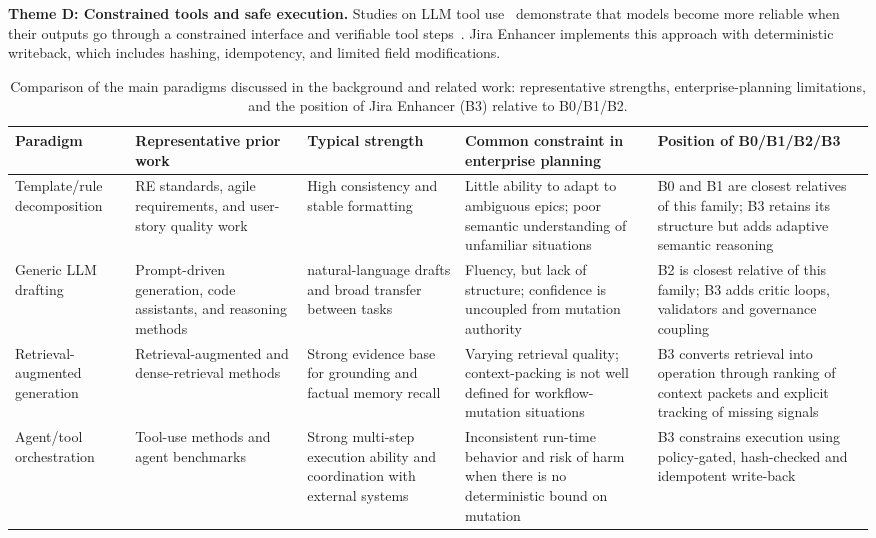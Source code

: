 \documentclass[pdflatex,sn-basic]{sn-jnl}
\begin{document}
\textbf{Theme D: Constrained tools and safe execution.} Studies on LLM tool use~\citep{R16} demonstrate that models become more reliable when their outputs go through a constrained interface and verifiable tool steps~\citep{R91}. Jira Enhancer implements this approach with deterministic writeback, which includes hashing, idempotency, and limited field modifications.

\begin{table}
\centering
\setlength{\tabcolsep}{4pt}
\small
\caption{Comparison of the main paradigms discussed in the background and related work: representative strengths, enterprise-planning limitations, and the position of Jira Enhancer (B3) relative to B0/B1/B2.}
\label{tab:related-work-comparative}
\begin{tabularx}{\textheight}{@{}>{\raggedright\arraybackslash}p{0.16\textheight}>{\raggedright\arraybackslash}p{0.19\textheight}>{\raggedright\arraybackslash}p{0.18\textheight}>{\raggedright\arraybackslash}p{0.20\textheight}>{\raggedright\arraybackslash}X@{}}
\toprule
Paradigm & Representative prior work & Typical strength & Common constraint in enterprise planning & Position of B0/B1/B2/B3 \\
\midrule
Template/rule decomposition & RE standards, agile requirements, and user-story quality work \citep{R52,R62,R63} & High consistency and stable formatting & Little ability to adapt to ambiguous epics; poor semantic understanding of unfamiliar situations & B0 and B1 are closest relatives of this family; B3 retains its structure but adds adaptive semantic reasoning \\
Generic LLM drafting & Prompt-driven generation, code assistants, and reasoning methods \citep{R1,R14,R59,R77} & natural-language drafts and broad transfer between tasks & Fluency, but lack of structure; confidence is uncoupled from mutation authority & B2 is closest relative of this family; B3 adds critic loops, validators and governance coupling \\
Retrieval-augmented generation & Retrieval-augmented and dense-retrieval methods \citep{R3,R5,R22} & Strong evidence base for grounding and factual memory recall & Varying retrieval quality; context-packing is not well defined for workflow-mutation situations & B3 converts retrieval into operation through ranking of context packets and explicit tracking of missing signals \\
Agent/tool orchestration & Tool-use methods and agent benchmarks \citep{R17,R27,R28,R92} & Strong multi-step execution ability and coordination with external systems & Inconsistent run-time behavior and risk of harm \citep{R87} when there is no deterministic bound on mutation & B3 constrains execution using policy-gated, hash-checked and idempotent write-back \\

\end{tabularx}
\end{table}
\end{document}
